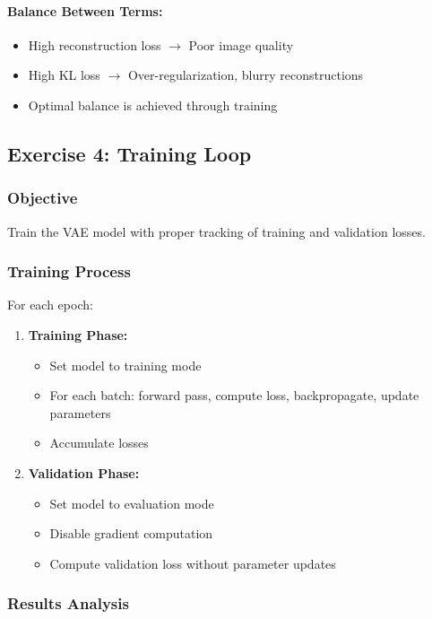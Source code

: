 \documentclass[conference]{IEEEtran}
\begin{document}
\paragraph{Balance Between Terms:}
\begin{itemize}
    \item High reconstruction loss $\rightarrow$ Poor image quality
    \item High KL loss $\rightarrow$ Over-regularization, blurry reconstructions
    \item Optimal balance is achieved through training
\end{itemize}

\subsection{Exercise 4: Training Loop}

\subsubsection{Objective}
Train the VAE model with proper tracking of training and validation losses.

\subsubsection{Training Process}
For each epoch:
\begin{enumerate}
    \item \textbf{Training Phase:}
    \begin{itemize}
        \item Set model to training mode
        \item For each batch: forward pass, compute loss, backpropagate, update parameters
        \item Accumulate losses
    \end{itemize}
    \item \textbf{Validation Phase:}
    \begin{itemize}
        \item Set model to evaluation mode
        \item Disable gradient computation
        \item Compute validation loss without parameter updates
    \end{itemize}
\end{enumerate}

\subsubsection{Results Analysis}
\end{document}
